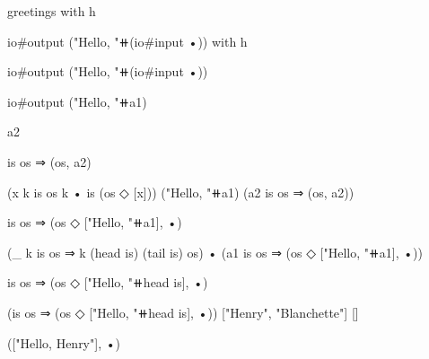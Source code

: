 \begin{snippet}
greetings with h

io#output ("Hello, "⧺(io#input •)) with h

io#output ("Hello, "⧺(io#input •))

io#output ("Hello, "⧺a1)

a2



is os ⇒ (os, a2)



(x k is os k • is (os ◇ [x]))
  ("Hello, "⧺a1) (a2 is os ⇒ (os, a2))

is os ⇒ (os ◇ ["Hello, "⧺a1], •)


(_ k is os ⇒ k (head is) (tail is) os)
  • (a1 is os ⇒ (os ◇ ["Hello, "⧺a1], •))

is os ⇒ (os ◇ ["Hello, "⧺head is], •)

(is os ⇒ (os ◇ ["Hello, "⧺head is], •))
  ["Henry", "Blanchette"] []

(["Hello, Henry"], •)
\end{snippet}
